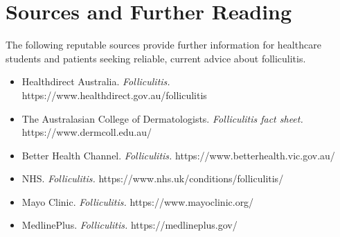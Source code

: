 \section*{Sources and Further Reading}
The following reputable sources provide further information for healthcare students and patients seeking reliable, current advice about folliculitis.
\begin{itemize}
    \item Healthdirect Australia. \textit{Folliculitis.} https://www.healthdirect.gov.au/folliculitis
    \item The Australasian College of Dermatologists. \textit{Folliculitis fact sheet.} https://www.dermcoll.edu.au/
    \item Better Health Channel. \textit{Folliculitis.} https://www.betterhealth.vic.gov.au/
    \item NHS. \textit{Folliculitis.} https://www.nhs.uk/conditions/folliculitis/
    \item Mayo Clinic. \textit{Folliculitis.} https://www.mayoclinic.org/
    \item MedlinePlus. \textit{Folliculitis.} https://medlineplus.gov/
\end{itemize}
